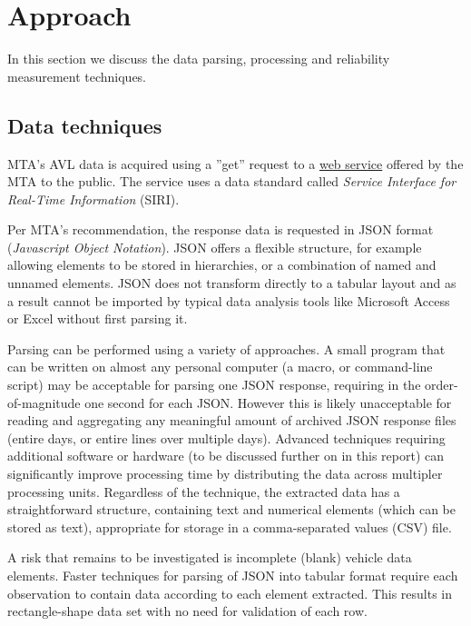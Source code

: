 \documentclass[12pt]{report}
\begin{document}
\newpage

\section{Approach}

In this section we discuss the data parsing, processing and reliability measurement techniques.

\subsection{Data techniques}

MTA's AVL data is acquired using a ''get'' request to a \href{http://bustime.mta.info/}{web service} offered by the MTA to the public.  The service uses a data standard called \textit{Service Interface for Real-Time Information} (SIRI). 

Per MTA's recommendation, the response data is requested in JSON format (\textit{Javascript Object Notation}).  JSON offers a flexible structure, for example allowing elements to be stored in hierarchies, or a combination of named and unnamed elements.  JSON does not transform directly to a tabular layout and as a result cannot be imported by typical data analysis tools like Microsoft Access or Excel without first parsing it.

Parsing can be performed using a variety of approaches.  A small program that can be written on almost any personal computer (a macro, or command-line script) may be acceptable for parsing one JSON response, requiring in the order-of-magnitude one second for each JSON.  However this is likely unacceptable for reading and aggregating any meaningful amount of archived JSON response files (entire days, or entire lines over multiple days).  Advanced techniques requiring additional software or hardware (to be discussed further on in this report) can significantly improve processing time by distributing the data across multipler processing units.  Regardless of the technique, the extracted data has a straightforward structure, containing text and numerical elements (which can be stored as text), appropriate for storage in a comma-separated values (CSV) file.

A risk that remains to be investigated is incomplete (blank) vehicle data elements.  Faster techniques for parsing of JSON into tabular format require each observation to contain data according to each element extracted.  This results in rectangle-shape data set with no need for validation of each row.
\end{document}
